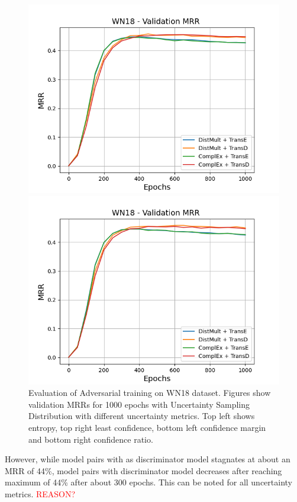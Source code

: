 \begin{figure}
\begin{minipage}{.5\textwidth}
    \end{minipage}
    \begin{minipage}{.5\textwidth}
      \centering
      \includegraphics[width=0.9\linewidth]{figures/results/gan_train/not_pretrained/uncertainty/max_distribution/confidence_margin/wn18/uncertainty_wn18_mrrs.png}
    \end{minipage}%
    \begin{minipage}{.5\textwidth}
      \centering
      \includegraphics[width=0.9\linewidth]{figures/results/gan_train/not_pretrained/uncertainty/max_distribution/confidence_ratio/wn18/uncertainty_wn18_mrrs.png}
    \end{minipage}%
    \caption{Evaluation of Adversarial training on \textsc{WN18} dataset. 
    Figures show validation MRRs for 1000 epochs with Uncertainty Sampling Distribution with different uncertainty metrics.
    Top left shows entropy, top right least confidence, 
    bottom left confidence margin and bottom right confidence ratio.}
    \label{fig:advtrain_metrics_wn18}
\end{figure}
However, while model pairs with \transd as discriminator model stagnates at about an MRR of 44\%, model pairs with \transe  discriminator model decreases after reaching maximum of 44\% after about 300 epochs.
This can be noted for all uncertainty metrics.
\textcolor{red}{REASON?}

